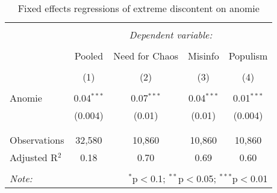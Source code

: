 
\begin{table}[!htbp] \centering 
  \caption{Fixed effects regressions of extreme discontent on anomie} 
  \label{tab:extreme_anomie} 
\begin{tabular}{@{\extracolsep{5pt}}lcccc} 
\\[-1.8ex]\hline 
\hline \\[-1.8ex] 
 & \multicolumn{4}{c}{\textit{Dependent variable:}} \\ 
\cline{2-5} 
\\[-1.8ex] & Pooled & Need for Chaos & Misinfo & Populism \\ 
\\[-1.8ex] & (1) & (2) & (3) & (4)\\ 
\hline \\[-1.8ex] 
 Anomie & 0.04$^{***}$ & 0.07$^{***}$ & 0.04$^{***}$ & 0.01$^{***}$ \\ 
  & (0.004) & (0.01) & (0.01) & (0.004) \\ 
  & & & & \\ 
\hline \\[-1.8ex] 
Observations & 32,580 & 10,860 & 10,860 & 10,860 \\ 
Adjusted R$^{2}$ & 0.18 & 0.70 & 0.69 & 0.60 \\ 
\hline 
\hline \\[-1.8ex] 
\textit{Note:}  & \multicolumn{4}{r}{$^{*}$p$<$0.1; $^{**}$p$<$0.05; $^{***}$p$<$0.01} \\ 
\end{tabular} 
\end{table} 

